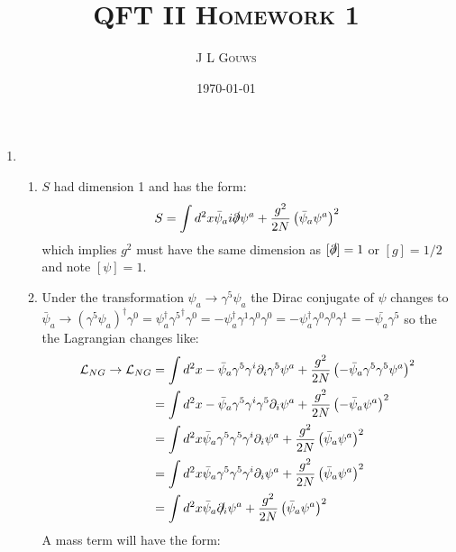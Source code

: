 \documentclass[12pt,a4]{article}
\title{
\textsc{QFT II Homework 1}
}
\author{\textsc{J L Gouws}
}
\date{\today
\\[1cm]}
\begin{document}
\thispagestyle{empty}

\maketitle

\begin{enumerate}
  \item
    \begin{enumerate}
      \item 
        $S$ had dimension 1 and has the form:
        \begin{equation*}
          S = \int d^2x \bar{\psi}_a i \slashed{\partial} \psi^a + \frac{g^2}{2N} \left(\bar{\psi}_a \psi^a\right)^2
        \end{equation*}
        which implies $g^2$ must have the same dimension as $[\slashed{\partial}] = 1$ or $[g] = 1/ 2$ and note $[\psi] = 1$.
      \item
        Under the transformation $\psi_a \to \gamma^5\psi_a$ the Dirac conjugate of $\psi$ changes to $\bar{\psi}_a \to \left(\gamma^5 \psi_a \right)^\dagger \gamma^0 = \psi_a^\dagger {\gamma^5}^\dagger \gamma^0 = -\psi_a^\dagger \gamma^1 \gamma^0 \gamma^0 = -\psi_a^\dagger \gamma^0 \gamma^0 \gamma^1 = - \bar{\psi_a}\gamma^5$ so the the Lagrangian changes like:
        \begin{align*}
          \mathcal{L}_{NG} \to \mathcal{L}_{NG} &= \int d^2x -\bar{\psi}_a \gamma^5 \gamma^i\partial_i \gamma^5 \psi^a + \frac{g^2}{2N} \left(-\bar{\psi}_a \gamma^5 \gamma^5\psi^a\right)^2\\
                                                &= \int d^2x -\bar{\psi}_a \gamma^5 \gamma^i \gamma^5 \partial_i \psi^a + \frac{g^2}{2N} \left(-\bar{\psi}_a \psi^a\right)^2\\
                                                &= \int d^2x \bar{\psi}_a \gamma^5 \gamma^5 \gamma^i \partial_i \psi^a + \frac{g^2}{2N} \left(\bar{\psi}_a \psi^a\right)^2\\
                                                &= \int d^2x \bar{\psi}_a \gamma^5 \gamma^5 \gamma^i \partial_i \psi^a + \frac{g^2}{2N} \left(\bar{\psi}_a \psi^a\right)^2\\
                                                &= \int d^2x \bar{\psi}_a \slashed{\partial_i} \psi^a + \frac{g^2}{2N} \left(\bar{\psi}_a \psi^a\right)^2
        \end{align*}
        A mass term will have the form:

\end{enumerate}
\end{enumerate}
\end{document}
